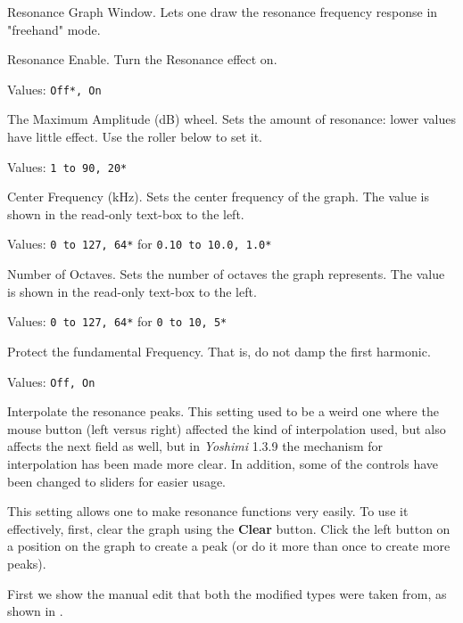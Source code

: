    \setcounter{ItemCounter}{0}      %

   Resonance Graph Window.
   Lets one draw the resonance frequency response in "freehand" mode.

   Resonance Enable.
   Turn the Resonance effect on.

   Values: \texttt{Off*, On}

   The Maximum Amplitude (dB) wheel.
   Sets the amount of resonance: lower values have little effect. Use the
   roller below to set it.

   Values: \texttt{1 to 90, 20*}

   Center Frequency (kHz).
   Sets the center frequency of the graph.
   The value is shown in the read-only text-box to the left.

   Values: \texttt{0 to 127, 64*} for \texttt{0.10 to 10.0, 1.0*}

   Number of Octaves.
   Sets the number of octaves the graph represents.
   The value is shown in the read-only text-box to the left.

   Values: \texttt{0 to 127, 64*} for \texttt{0 to 10, 5*}

   Protect the fundamental Frequency.
   That is, do not damp the first harmonic.

   Values: \texttt{Off, On}

   Interpolate the resonance peaks.
   This setting used to be a weird one where the mouse button (left versus
   right) affected the kind of interpolation used,
   but also affects the next field as well, but in \textsl{Yoshimi} 1.3.9 the
   mechanism for interpolation has been made more clear.
   In addition, some of the controls have been changed to sliders for easier
   usage.

   This setting allows one to make resonance functions very easily.  To use
   it effectively, first, clear the graph using the \textbf{Clear} button.
   Click the left button on a position on the graph to create a peak (or do it
   more than once to create more peaks).

   First we show the manual edit that both the modified types were taken from, as shown in .

